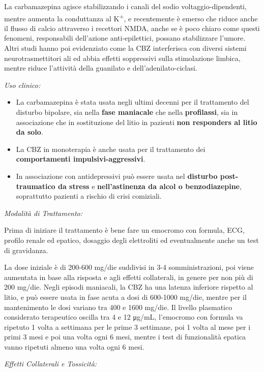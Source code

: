 \documentclass[]{article}
\begin{document}
La carbamazepina agisce stabilizzando i canali del sodio
voltaggio-dipendenti, mentre aumenta la conduttanza al
K\textsuperscript{+}, e recentemente è emerso che riduce anche il flusso
di calcio attraverso i recettori NMDA, anche se è poco chiaro come
questi fenomeni, responsabili dell'azione anti-epilettici, possano
stabilizzare l'umore. Altri studi hanno poi evidenziato come la CBZ
interferisca con diversi sistemi neurotrasmettitori ali ed abbia effetti
soppressivi sulla stimolazione limbica, mentre riduce l'attività della
guanilato e dell'adenilato-ciclasi.

\emph{\emph{Uso clinico:}}

\begin{itemize}
\item
  La carbamazepina è stata usata negli ultimi decenni per il trattamento
  del disturbo bipolare, sia nella \textbf{fase maniacale} che nella
  \textbf{profilassi}, sia in associazione che in sostituzione del litio
  in pazienti \textbf{non responders al litio da solo}.
\item
  La CBZ in monoterapia è anche usata per il trattamento dei
  \textbf{comportamenti impulsivi-aggressivi}.
\item
  In associazione con antidepressivi può essere usata nel
  \textbf{disturbo post-traumatico da stress} e \textbf{nell'astinenza
  da alcol o benzodiazepine}, soprattutto pazienti a rischio di crisi
  comiziali.
\end{itemize}

\emph{\emph{Modalità di Trattamento:}}

Prima di iniziare il trattamento è bene fare un emocromo con formula,
ECG, profilo renale ed epatico, dosaggio degli elettroliti ed
eventualmente anche un test di gravidanza.

La dose iniziale è di 200-600 mg/die suddivisi in 3-4 somministrazioni,
poi viene aumentata in base alla risposta e agli effetti collaterali, in
genere per non più di 200 mg/die. Negli episodi maniacali, la CBZ ha una
latenza inferiore rispetto al litio, e può essere usata in fase acuta a
dosi di 600-1000 mg/die, mentre per il mantenimento le dosi variano tra
400 e 1600 mg/die. Il livello plasmatico considerato terapeutico oscilla
tra 4 e 12 μg/mL, l'emocromo con formula va ripetuto 1 volta a settimana
per le prime 3 settimane, poi 1 volta al mese per i primi 3 mesi e poi
una volta ogni 6 mesi, mentre i test di funzionalità epatica vanno
ripetuti almeno una volta ogni 6 mesi.

\emph{\emph{Effetti Collaterali e Tossicità:}}
\end{document}
